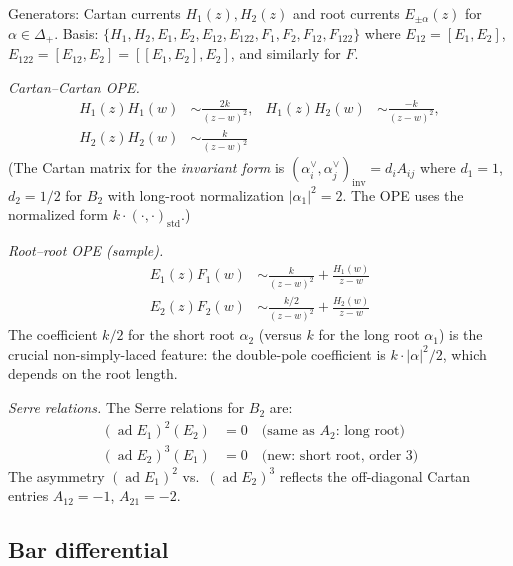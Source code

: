 \begin{computation}\label{comp:so5-ope}
Generators: Cartan currents $H_1(z), H_2(z)$ and root currents
$E_{\pm\alpha}(z)$ for $\alpha \in \Delta_+$.  Basis:
$\{H_1, H_2, E_1, E_2, E_{12}, E_{122}, F_1, F_2, F_{12}, F_{122}\}$
where $E_{12} = [E_1, E_2]$, $E_{122} = [E_{12}, E_2] = [[E_1, E_2], E_2]$,
and similarly for $F$.

\emph{Cartan--Cartan OPE.}
\begin{align*}
H_1(z) H_1(w) &\sim \frac{2k}{(z-w)^2}, &
H_1(z) H_2(w) &\sim \frac{-k}{(z-w)^2}, \\
H_2(z) H_2(w) &\sim \frac{k}{(z-w)^2} &
\end{align*}
(The Cartan matrix for the \emph{invariant form} is
$(\alpha_i^\vee, \alpha_j^\vee)_{\mathrm{inv}} = d_i A_{ij}$ where
$d_1 = 1$, $d_2 = 1/2$ for $B_2$ with long-root normalization
$|\alpha_1|^2 = 2$.  The OPE uses the normalized form
$k \cdot (\cdot, \cdot)_{\mathrm{std}}$.)

\emph{Root--root OPE (sample).}
\begin{align*}
E_1(z) F_1(w) &\sim \frac{k}{(z-w)^2} + \frac{H_1(w)}{z-w} \\
E_2(z) F_2(w) &\sim \frac{k/2}{(z-w)^2} + \frac{H_2(w)}{z-w}
\end{align*}
The coefficient $k/2$ for the short root $\alpha_2$ (versus $k$ for the
long root $\alpha_1$) is the crucial non-simply-laced feature: the
double-pole coefficient is $k \cdot |\alpha|^2/2$, which depends on
the root length.

\emph{Serre relations.}
The Serre relations for $B_2$ are:
\begin{align}
(\operatorname{ad} E_1)^2(E_2) &= 0
\quad\text{(same as $A_2$: long root)} \label{eq:serre-B2-1} \\
(\operatorname{ad} E_2)^3(E_1) &= 0
\quad\text{(new: short root, order 3)} \label{eq:serre-B2-2}
\end{align}
The asymmetry $(\operatorname{ad} E_1)^2$ vs.\
$(\operatorname{ad} E_2)^3$ reflects the off-diagonal Cartan entries
$A_{12} = -1$, $A_{21} = -2$.
\end{computation}

\subsection{Bar differential}

